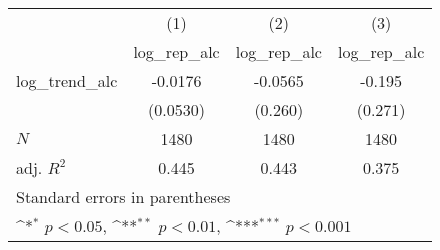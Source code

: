 {
\def\sym#1{\ifmmode^{#1}\else\(^{#1}\)\fi}
\begin{tabular}{l*{3}{c}}
\hline\hline
            &\multicolumn{1}{c}{(1)}&\multicolumn{1}{c}{(2)}&\multicolumn{1}{c}{(3)}\\
            &\multicolumn{1}{c}{log\_rep\_alc}&\multicolumn{1}{c}{log\_rep\_alc}&\multicolumn{1}{c}{log\_rep\_alc}\\
\hline
log\_trend\_alc&     -0.0176         &     -0.0565         &      -0.195         \\
            &    (0.0530)         &     (0.260)         &     (0.271)         \\
\hline
\(N\)       &        1480         &        1480         &        1480         \\
adj. \(R^{2}\)&       0.445         &       0.443         &       0.375         \\
\hline\hline
\multicolumn{4}{l}{\footnotesize Standard errors in parentheses}\\
\multicolumn{4}{l}{\footnotesize \sym{*} \(p<0.05\), \sym{**} \(p<0.01\), \sym{***} \(p<0.001\)}\\
\end{tabular}
}
